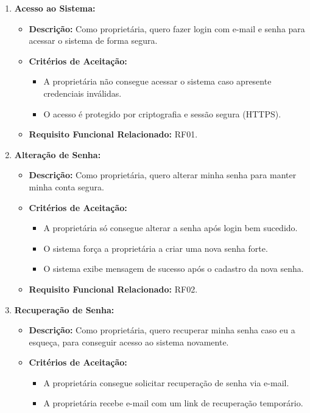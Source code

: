 \documentclass[
	12pt,				%
	openany,			%
	oneside,			%
	a4paper,			%
	english,			%
	french,				%
	spanish,			%
	brazil				%
	]{abntex2}
\begin{document}
\begin{enumerate}[label=\textbf{\arabic*.}]
	\item \textbf{Acesso ao Sistema:}
	\begin{itemize}
		\item \textbf{Descrição:} Como proprietária, quero fazer login com e-mail e senha para acessar o sistema de forma segura. 
		\item	\textbf{Critérios de Aceitação:}	
		\begin{itemize} 
			\item A proprietária não consegue acessar o sistema caso apresente credenciais inválidas.
			\item O acesso é protegido por criptografia e sessão segura (HTTPS).
		\end{itemize}
		\item \textbf{Requisito Funcional Relacionado:} RF01.
	\end{itemize} 
	\item \textbf{Alteração de Senha:}
	\begin{itemize}
		\item \textbf{Descrição:} Como proprietária, quero alterar minha senha para manter minha conta segura.
		\item \textbf{Critérios de Aceitação:}
		\begin{itemize} 
			\item A proprietária só consegue alterar a senha após login bem sucedido.
			\item O sistema força a proprietária a criar uma nova senha forte.
			\item O sistema exibe mensagem de sucesso após o cadastro da nova senha.
		\end{itemize}
		\item \textbf{Requisito Funcional Relacionado:} RF02.
	\end{itemize} 
	\item \textbf{Recuperação de Senha:}
	\begin{itemize}
		\item \textbf{Descrição:} Como proprietária, quero recuperar minha senha caso eu a esqueça, para conseguir acesso ao sistema novamente.
		\item \textbf{Critérios de Aceitação:}
		\begin{itemize} 
			\item A proprietária consegue solicitar recuperação de senha via e-mail.
			\item A proprietária recebe e-mail com um link de recuperação temporário.

\end{itemize}
\end{itemize}
\end{enumerate}
\end{document}
